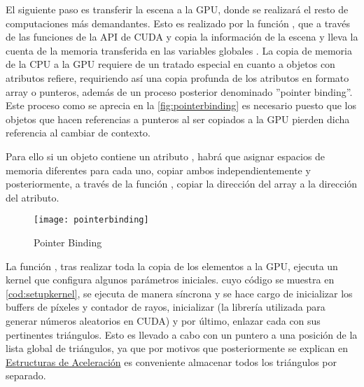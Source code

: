 El siguiente paso es transferir la escena a la GPU, donde se realizará el resto de computaciones más demandantes. Esto es realizado por la función , que a través de las funciones de la API de CUDA  y  copia la información de la escena y lleva la cuenta de la memoria transferida en las variables globales . La copia de memoria de la CPU a la GPU requiere de un tratado especial en cuanto a objetos con atributos refiere, requiriendo así una copia profunda de los atributos en formato array o punteros, además de un proceso posterior denominado ''pointer binding''. Este proceso como se aprecia en la \autoref{fig:pointerbinding} es necesario puesto que los objetos que hacen referencias a punteros al ser copiados a la GPU pierden dicha referencia al cambiar de contexto. 

Para ello si un objeto  contiene un atributo , habrá que asignar espacios de memoria diferentes para cada uno, copiar ambos independientemente y posteriormente, a través de la función , copiar la dirección del array a la dirección del atributo.


\begin{figure}[H]
    \centering
	\texttt{[image: pointerbinding]}
	\caption{Pointer Binding}
	\label{fig:pointerbinding}
\end{figure}


La función , tras realizar toda la copia de los elementos a la GPU, ejecuta un kernel que configura algunos parámetros iniciales.  cuyo código se muestra en \autoref{cod:setupkernel}, se ejecuta de manera síncrona y se hace cargo de inicializar los buffers de píxeles y contador de rayos, inicializar  (la librería utilizada para generar números aleatorios en CUDA) y por último, enlazar cada  con sus pertinentes triángulos. Esto es llevado a cabo con un puntero a una posición de la lista global de triángulos, ya que por motivos que posteriormente se explican en \hyperref[BVH]{Estructuras de Aceleración} es conveniente almacenar todos los triángulos por separado. 


